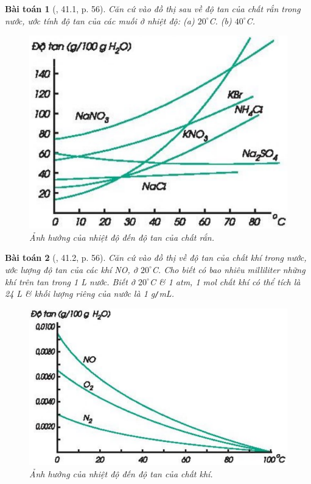 \documentclass{article}
\newtheorem{baitoan}{Bài toán}
\begin{document}
\begin{baitoan}[\cite{SBT_Hoa_Hoc_8}, 41.1, p. 56]
	Căn cứ vào đồ thị sau về độ tan của chất rắn trong nước, ước tính độ tan của các muối \emph{} ở nhiệt độ: (a) $20^\circ$\emph{C}. (b) $40^\circ$\emph{C}.
	\begin{figure}[H]
		\centering
		\includegraphics[scale=0.3]{nhiet_do_do_tan_chat_ran}
		\caption{Ảnh hưởng của nhiệt độ đến độ tan của chất rắn.}
	\end{figure}
\end{baitoan}

\begin{baitoan}[\cite{SBT_Hoa_Hoc_8}, 41.2, p. 56]
	Căn cứ vào đồ thị về độ tan của chất khí trong nước, ước lượng độ tan của các khí \emph{NO, } ở $20^\circ$\emph{C}. Cho biết có bao nhiêu milliliter những khí trên tan trong \emph{1 L} nước. Biết ở $20^\circ$\emph{C} \& \emph{1 atm, 1 mol} chất khí có thể tích là \emph{24 L} \& khối lượng riêng của nước là \emph{1 g\texttt{/}mL}.	
	\begin{figure}[H]
		\centering
		\includegraphics[scale=0.3]{nhiet_do_do_tan_chat_khi}
		\caption{Ảnh hưởng của nhiệt độ đến độ tan của chất khí.}
	\end{figure}
\end{baitoan}
\end{document}
